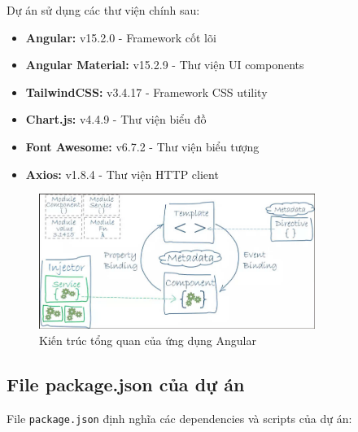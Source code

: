 Dự án sử dụng các thư viện chính sau:

\begin{tcolorbox}[colback=green!5,colframe=green!40!black,title=Dependencies chính]
\begin{itemize}
  \item \textbf{Angular:} v15.2.0 - Framework cốt lõi
  \item \textbf{Angular Material:} v15.2.9 - Thư viện UI components
  \item \textbf{TailwindCSS:} v3.4.17 - Framework CSS utility
  \item \textbf{Chart.js:} v4.4.9 - Thư viện biểu đồ
  \item \textbf{Font Awesome:} v6.7.2 - Thư viện biểu tượng
  \item \textbf{Axios:} v1.8.4 - Thư viện HTTP client
\end{itemize}
\end{tcolorbox}

\begin{figure}[H]
\centering
\includegraphics[width=0.8\textwidth]{latex/imgs/kientruc.jpg}
\caption{Kiến trúc tổng quan của ứng dụng Angular}
\end{figure}

\subsection{File package.json của dự án}

File \texttt{package.json} định nghĩa các dependencies và scripts của dự án:

